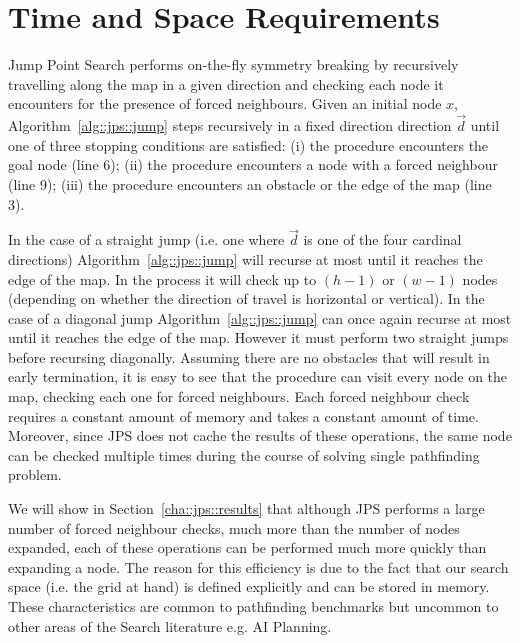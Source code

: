 \section{Time and Space Requirements}
Jump Point Search performs on-the-fly symmetry breaking by recursively travelling
along the map in a given direction and checking each node it encounters for the
presence of forced neighbours. 
Given an initial node $x$, Algorithm~\ref{alg::jps::jump} steps recursively in
a fixed direction direction $\vec{d}$ until one of three stopping conditions 
are satisfied: 
(i) the procedure encounters the goal node (line 6); 
(ii) the procedure encounters a node with a forced neighbour (line 9); 
(iii) the procedure encounters an obstacle or the edge of the map (line 3).  

In the case of a straight jump
(i.e. one where $\vec{d}$ is one of the four cardinal directions)
Algorithm~\ref{alg::jps::jump} will recurse at most until it reaches the edge of
the map. In the process it will check up to $(h-1)$ or $(w-1)$ nodes 
(depending on whether the direction of travel is horizontal or vertical).
In the case of a diagonal jump Algorithm~\ref{alg::jps::jump} can once again
recurse at most until it reaches the edge of the map. However it must perform two 
straight jumps before recursing diagonally. Assuming there are no obstacles that
will result in early termination, it is easy to see that the procedure can visit
every node on the map, checking each one for forced neighbours. 
Each forced neighbour check requires a constant amount of memory and takes a constant
amount of time. Moreover, since JPS does not cache the results of these operations, 
the same node can be checked multiple times during the course of solving single 
pathfinding problem. 

We will show in Section~\ref{cha::jps::results}
that although JPS performs a large number of forced neighbour checks, much more than
the number of nodes expanded, each of these operations can be performed much more 
quickly than expanding a node. The reason for this efficiency is due to the fact that
our search space (i.e. the grid at hand) is defined explicitly and can be stored
in memory. These characteristics are common to pathfinding benchmarks but uncommon 
to other areas of the Search literature e.g. AI Planning. 
